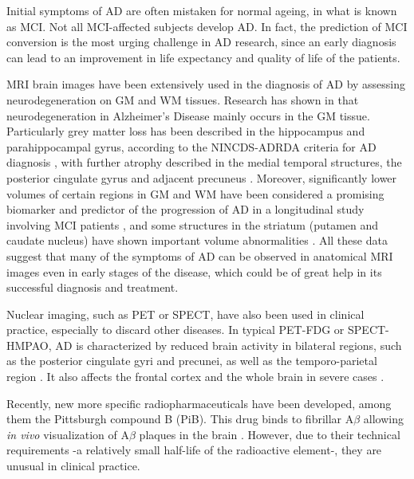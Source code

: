 Initial symptoms of \ac{AD} are often mistaken for normal ageing, in what is known as \acf{MCI}. Not all \ac{MCI}-affected subjects develop \ac{AD}. In fact, the prediction of \ac{MCI} conversion is the most urging challenge in \ac{AD} research, since an early diagnosis can lead to an improvement in life expectancy and quality of life of the patients. 

\ac{MRI} brain images have been extensively used in the diagnosis of \ac{AD} by assessing neurodegeneration on \ac{GM} and \ac{WM} tissues. Research has shown in \cite{Baron2001,Misra2009,Pievani2013,Dubois2007} that neurodegeneration in Alzheimer's Disease mainly occurs in the \ac{GM} tissue. Particularly grey matter loss has been described in the hippocampus and parahippocampal gyrus, according to the NINCDS-ADRDA criteria for AD diagnosis \cite{Dubois2007}, with further atrophy described in the medial temporal structures, the posterior cingulate gyrus and adjacent precuneus \cite{Baron2001}. Moreover, significantly lower volumes of certain regions in \ac{GM} and \ac{WM} have been considered a promising biomarker and predictor of the progression of \ac{AD} in a longitudinal study involving \ac{MCI} patients \cite{Misra2009}, and some structures in the striatum (putamen and caudate nucleus) have shown important volume abnormalities \cite{Pievani2013}. All these data suggest that many of the symptoms of \ac{AD} can be observed in anatomical \ac{MRI} images even in early stages of the disease, which could be of great help in its successful diagnosis and treatment. 

Nuclear imaging, such as \ac{PET} or \ac{SPECT}, have also been used in clinical practice, especially to discard other diseases. In typical \ac{PET}-FDG or \ac{SPECT}-HMPAO, \ac{AD} is characterized by reduced brain activity in bilateral regions, such as the posterior cingulate gyri and precunei, as well as the temporo-parietal region \cite{Claus1994}. It also affects the frontal cortex and the whole brain in severe cases \cite{Leon1983,Kogure2000}. 

Recently, new more specific radiopharmaceuticals have been developed, among them the Pittsburgh compound B (PiB). This drug binds to fibrillar A$\beta$ allowing \textit{in vivo} visualization of A$\beta$ plaques in the brain \cite{Ikonomovic2008}. However, due to their technical requirements -a relatively small half-life of the radioactive element-, they are unusual in clinical practice. 


